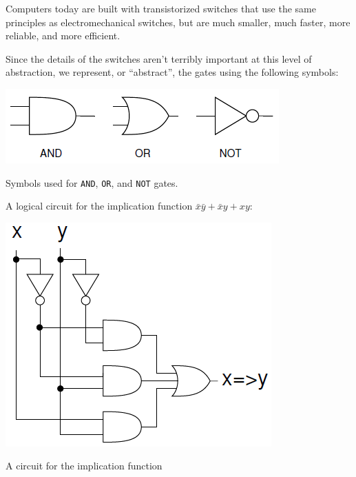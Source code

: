 \documentclass[8pt,a4paper,compress,handout]{beamer}
\begin{document}
\begin{frame}[fragile]
Computers today are built with transistorized switches that use the same principles as electromechanical switches, but are much smaller, much faster, more reliable, and more efficient. 

\bigskip

Since the details of the switches aren't terribly important at this level of abstraction, we represent, or ``abstract'', the gates using the following symbols:
\begin{center}
\includegraphics[scale=0.3]{figures/gate_symbols.png}

\smallskip

\tiny Symbols used for \lstinline{AND}, \lstinline{OR}, and \lstinline{NOT} gates.
\end{center}

\bigskip

A logical circuit for the implication function $\bar{x}\bar{y}+\bar{x}y+xy$:
\begin{center}
\includegraphics[scale=0.22]{figures/implication_circuit.png}

\smallskip

\tiny A circuit for the implication function
\end{center}
\end{frame}
\end{document}
